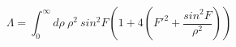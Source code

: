 \begin{equation}
\Lambda=\int_0^\infty d\rho~\rho^2~sin^2F (1+4(F'^2 + \frac{sin^2F}{\rho^2}))
\end{equation}

